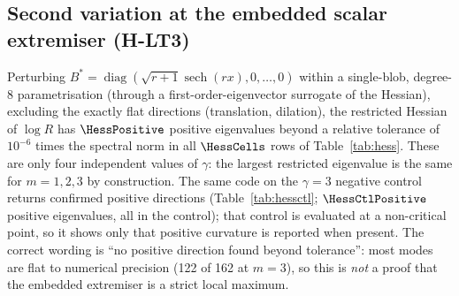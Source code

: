\documentclass[11pt]{article}
\theoremstyle{remark}
\begin{document}
\subsection{Second variation at the embedded scalar extremiser (H-LT3)}
Perturbing $B^*=\operatorname{diag}(\sqrt{r+1}\operatorname{sech}(rx),0,\dots,0)$ within a single-blob, degree-8 parametrisation (through a first-order-eigenvector surrogate of the Hessian), excluding the exactly flat directions (translation, dilation),
the restricted Hessian of $\log R$ has $\HessPositive$ positive eigenvalues beyond a relative tolerance of $10^{-6}$ times the spectral norm in all $\HessCells$ rows of Table~\ref{tab:hess}. These are only four independent values of $\gamma$:
the largest restricted eigenvalue is the same for $m=1,2,3$ by construction. The same code on the $\gamma=3$ negative control returns confirmed positive directions (Table~\ref{tab:hessctl}; $\HessCtlPositive$ positive eigenvalues, all in the control); that control is evaluated at a non-critical point, so it shows only that positive curvature is reported when present.
The correct wording is ``no positive direction found beyond tolerance'': most modes are flat to numerical precision (122 of 162 at $m=3$), so this is \emph{not} a proof that the embedded extremiser is a strict local maximum.
\begin{table}[h]\centering\small

\caption{Restricted Hessian spectrum summary at the embedded scalar extremiser (from \texttt{LT\_B/result.json}).}\label{tab:hess}
\end{table}
\begin{table}[h]\centering\small

\caption{Negative control, $\gamma=3$: positive directions are found, as they must be.}\label{tab:hessctl}
\end{table}
\end{document}
